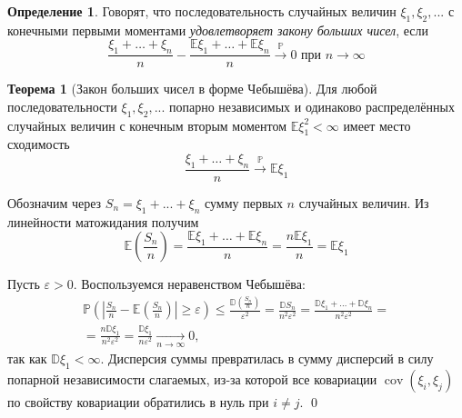 \documentclass[oneside,final,14pt]{extreport}
\renewenvironment{proof}{{\bfseries Доказательство.}}{\qed}
\theoremstyle{plain}
\theoremstyle{definition}
\newtheorem*{defn}{Определение}
\theoremstyle{named}
\newtheorem*{namedthm}{Теорема}
\begin{document}
\begin{defn}
    Говорят, что последовательность случайных величин $\xi_1, \xi_2, ...$ с конечными первыми моментами {\it удовлетворяет закону больших чисел}, если
    \begin{equation*}
        \frac{\xi_{1}+\ldots+\xi_{n}}{n}-\frac{\mathbb{E} \xi_{1}+\ldots+\mathbb{E} \xi_{n}}{n} \stackrel{\mathbb{P}}{\longrightarrow} 0 \text { при } n \rightarrow \infty
    \end{equation*}
\end{defn}
\begin{namedthm}[Закон больших чисел в форме Чебышёва]
    Для любой последовательности $\xi_1, \xi_2, ...$ попарно независимых и одинаково распределённых случайных величин с конечным вторым моментом $\mathbb{E}\xi_1^2 < \infty$ имеет место сходимость
    \begin{equation*}
        \frac{\xi_{1}+\ldots+\xi_{n}}{n} \stackrel{\mathbb{P}}{\longrightarrow} \mathbb{E} \xi_{1}
    \end{equation*}
\end{namedthm}

\begin{proof}
    Обозначим через $S_n = \xi_1 + ... + \xi_n$ сумму первых $n$ случайных величин. Из линейности матожидания получим
    \begin{equation*}
        \mathbb{E}\left(\frac{S_{n}}{n}\right)=\frac{\mathbb{E} \xi_{1}+\ldots+\mathbb{E} \xi_{n}}{n}=\frac{n \mathbb{E} \xi_{1}}{n}=\mathbb{E} \xi_{1}
    \end{equation*}
    
    Пусть $\varepsilon > 0.$ Воспользуемся неравенством Чебышёва:
    \begin{multline*}
        \mathbb{P}\left(\left|\frac{S_{n}}{n}-\mathbb{E}\left(\frac{S_{n}}{n}\right)\right| \geqslant \varepsilon\right) \leqslant \frac{\mathbb{D}\left(\frac{S_{n}}{n}\right)}{\varepsilon^{2}}
        = \frac{\mathbb{D} S_{n}}{n^{2} \varepsilon^{2}}
        = \frac{\mathbb{D} \xi_{1}+\ldots+\mathbb{D} \xi_{n}}{n^{2} \varepsilon^{2}}= \\
        = \frac{n \mathbb{D} \xi_{1}}{n^{2} \varepsilon^{2}}
        = \frac{\mathbb{D} \xi_{1}}{n \varepsilon^{2}} \xrightarrow[n \to \infty]{} 0,
    \end{multline*}
    так как $\mathbb{D}\xi_1 < \infty$. Дисперсия суммы превратилась в сумму дисперсий в силу попарной независимости слагаемых, из-за которой все ковариации $\operatorname{cov}(\xi_i, \xi_j)$ по свойству ковариации обратились в нуль при $i \neq j$.
\end{proof}
\end{document}

